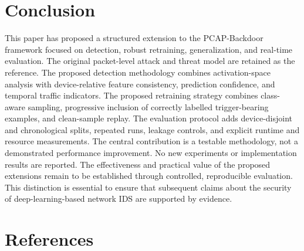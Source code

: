 \documentclass[11pt]{article}
\begin{document}
\section{Conclusion}
This paper has proposed a structured extension to the PCAP-Backdoor framework focused on detection, robust retraining, generalization, and real-time evaluation. The original packet-level attack and threat model are retained as the reference. The proposed detection methodology combines activation-space analysis with device-relative feature consistency, prediction confidence, and temporal traffic indicators. The proposed retraining strategy combines class- aware sampling, progressive inclusion of correctly labelled trigger-bearing examples, and clean-sample replay. The evaluation protocol adds device-disjoint and chronological splits, repeated runs, leakage controls, and explicit runtime and resource measurements. The central contribution is a testable methodology, not a demonstrated performance improvement. No new experiments or implementation results are reported. The effectiveness and practical value of the proposed extensions remain to be established through controlled, reproducible evaluation. This distinction is essential to ensure that subsequent claims about the security of deep-learning-based network IDS are supported by evidence.

\section*{References}


\end{document}
